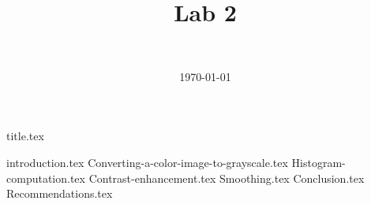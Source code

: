\documentclass[final]{report} %
\title{Lab 2}
\author{~}
\date{\today}
\begin{document}

{title.tex}
\newpage
\tableofcontents

\newpage
{}
{introduction.tex}
{Converting-a-color-image-to-grayscale.tex}
{Histogram-computation.tex}
{Contrast-enhancement.tex}
{Smoothing.tex}
{Conclusion.tex}
{Recommendations.tex}
\newpage
{}

\printbibliography
\end{document}
